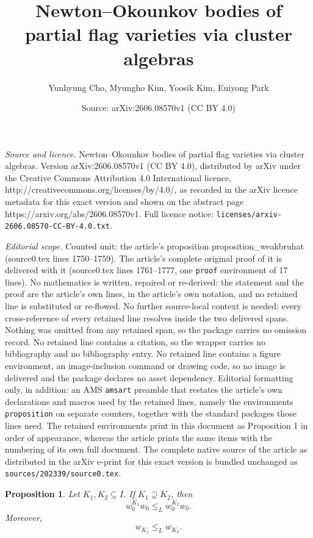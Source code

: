 \documentclass[10pt,a4paper]{amsart}
\title{Newton--Okounkov bodies of partial flag varieties via cluster algebras}
\author{Yunhyung Cho, Myungho Kim, Yoosik Kim, Euiyong Park}
\date{Source: arXiv:2606.08570v1 (CC BY 4.0)}
\newtheorem{proposition}{Proposition}
\begin{document}
\maketitle

\noindent\emph{Source and licence.} Newton--Okounkov bodies of partial flag varieties via cluster algebras. Version arXiv:2606.08570v1 (CC BY 4.0), distributed by arXiv under the Creative Commons Attribution 4.0 International licence, http://creativecommons.org/licenses/by/4.0/, as recorded in the arXiv licence metadata for this exact version and shown on the abstract page https://arxiv.org/abs/2606.08570v1. Full licence notice: \texttt{licenses/arxiv-2606.08570-CC-BY-4.0.txt}.\par\smallskip

\noindent\textit{Editorial scope.} Counted unit: the article's proposition proposition\_weakbruhat (source0.tex lines 1750--1759). The article's complete original proof of it is delivered with it (source0.tex lines 1761--1777, one \texttt{proof} environment of 17 lines). No mathematics is written, repaired or re-derived: the statement and the proof are the article's own lines, in the article's own notation, and no retained line is substituted or re-flowed.  No further source-local context is needed: every cross-reference of every retained line resolves inside the two delivered spans.  Nothing was omitted from any retained span, so the package carries no omission record.  No retained line contains a citation, so the wrapper carries no bibliography and no bibliography entry.  No retained line contains a figure environment, an image-inclusion command or drawing code, so no image is delivered and the package declares no asset dependency.  Editorial formatting only, in addition: an AMS \texttt{amsart} preamble that restates the article's own declarations and macros used by the retained lines, namely the environments \texttt{proposition} on separate counters, together with the standard packages those lines need.  The retained environments print in this document as Proposition 1 in order of appearance, whereas the article prints the same items with the numbering of its own full document.  The complete native source of the article as distributed in the arXiv e-print for this exact version is bundled unchanged as \texttt{sources/202339/source0.tex}.
\begin{proposition}\label{proposition_weakbruhat}
Let $K_1, K_2 \subseteq I$.  If $K_1 \supseteq K_2$, then 
\begin{equation}\label{equ_propweakbruhat}
w^{{K_1}}_0 w_0 \leq_L w^{{K_2}}_0 w_0.
\end{equation}
Moreover,
\begin{equation}\label{equ_propweakbruhat2}
w_{K_1} \leq_L  w_{K_2}.
\end{equation}
\end{proposition}
\end{document}

